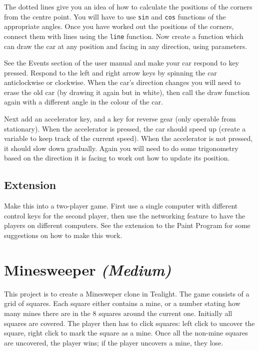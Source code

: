 \documentclass[12pt,a4paper,twoside]{article}
\renewcommand{\_}{\texttt{\symbol{95}}}
\begin{document}
The dotted lines give you an idea of how to calculate the positions
of the corners from the centre point. You will have to use \verb^sin^ and
\verb^cos^ functions of the appropriate angles. Once you have worked out
the positions of the corners, connect them with lines using the \verb^line^
function. Now create a function which can draw the car at any position
and facing in any direction, using parameters.

See the Events section of the user manual and make your car respond to key pressed. Respond
to the left and right arrow keys by spinning the car anticlockwise
or clockwise. When the car's direction changes you will
need to erase the old car (by drawing it again but in white), then
call the draw function again with a different angle in the colour of the car.

Next add an accelerator key, and a key for reverse gear (only operable
from stationary). When the accelerator is pressed, the car should
speed up (create a variable to keep track of the current speed).
When the accelerator is not pressed, it should slow down gradually.
Again you will need to do some trigonometry based on the direction it
is facing to work out how to update its position.

\subsection{Extension}

Make this into a two-player game. First use a single computer with
different control keys for the second player, then use the networking
feature to have the players on different computers. See the extension
to the Paint Program for some suggestions on how to make this work.



\newpage
\section{Minesweeper \it{(Medium)}}

This project is to create a Minesweper clone in Tealight. The game consists of a
grid of squares. Each square either contains a mine, or a number stating how
many mines there are in the 8 squares around the current one.  Initially all
squares are covered. The player then has to click squares: left click to
uncover the square, right click to mark the square as a mine.  Once all the
non-mine squares are uncovered, the player wins; if the player uncovers a mine,
they lose.
\end{document}
